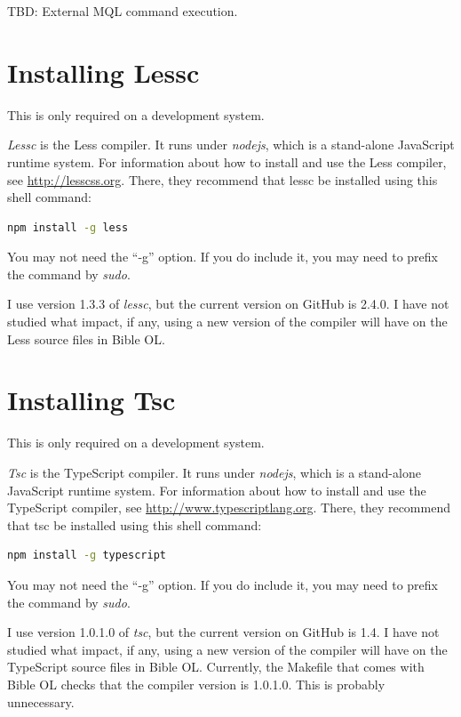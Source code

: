 \documentclass[11pt,oneside,a4paper]{memoir}
\begin{document}
TBD: External MQL command execution.


\section{Installing Lessc}\label{sec-installing-lessc}

This is only required on a development system.

\emph{Lessc} is the Less compiler. It runs under \emph{nodejs}, which is a stand-alone JavaScript
runtime system. For information about how to install and use the Less compiler, see
\url{http://lesscss.org}. There, they recommend that lessc be installed using this shell command:

\begin{lstlisting}[language=bash]
npm install -g less
\end{lstlisting}

You may not need the ``-g'' option. If you do include it, you may need to prefix the command by
\emph{sudo}.

I use version 1.3.3 of \emph{lessc}, but the current version on GitHub is 2.4.0. I have not studied
what impact, if any, using a new version of the compiler will have on the Less source files in Bible
OL.

\section{Installing Tsc}\label{sec-installing-tsc}

This is only required on a development system.

\emph{Tsc} is the TypeScript compiler. It runs under \emph{nodejs}, which is a stand-alone
JavaScript runtime system. For information about how to install and use the TypeScript compiler, see
\url{http://www.typescriptlang.org}. There, they recommend that tsc be installed using this shell
command:

\begin{lstlisting}[language=bash]
npm install -g typescript
\end{lstlisting}

You may not need the ``-g'' option. If you do include it, you may need to prefix the command by
\emph{sudo}.

I use version 1.0.1.0 of \emph{tsc}, but the current version on GitHub is 1.4. I have not studied
what impact, if any, using a new version of the compiler will have on the TypeScript source files in
Bible OL. Currently, the Makefile that comes with Bible OL checks that the compiler version is
1.0.1.0. This is probably unnecessary.
\end{document}
